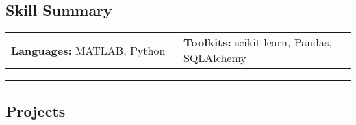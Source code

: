 \documentclass[10pt,letterpaper]{article}
\newenvironment{indentsection}[1]%
{\begin{list}{}%
	{\setlength{\leftmargin}{#1}}%
	\item[]%
}
{\end{list}}
\begin{document}
\subsection*{Skill Summary}
\begin{indentsection}{\parindent}
\begin{tabular}{p{0.5\linewidth}   p{0.5\linewidth} } 

\textbf{Languages:}  	  MATLAB, Python			& \textbf{Toolkits:}  	 scikit-learn, Pandas, SQLAlchemy \\  





\end{tabular}
\end{indentsection}

\hrule
\vspace{-0.4em}
\subsection*{Projects}
\end{document}
